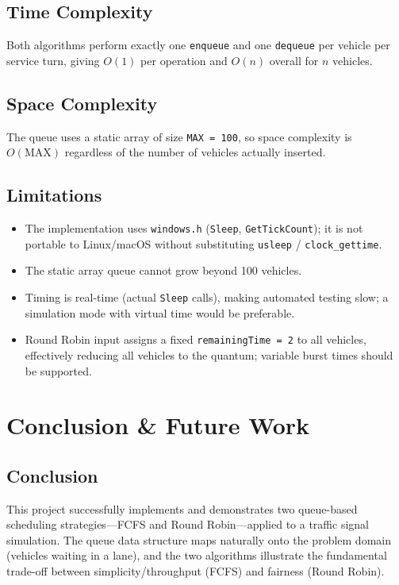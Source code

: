 \documentclass[12pt,a4paper]{article}
\begin{document}
\subsection{Time Complexity}
Both algorithms perform exactly one \texttt{enqueue} and one \texttt{dequeue} per vehicle per service turn, giving $O(1)$ per operation and $O(n)$ overall for $n$ vehicles.

\subsection{Space Complexity}
The queue uses a static array of size \texttt{MAX = 100}, so space complexity is $O(\text{MAX})$ regardless of the number of vehicles actually inserted.

\subsection{Limitations}
\begin{itemize}
    \item The implementation uses \texttt{windows.h} (\texttt{Sleep}, \texttt{GetTickCount}); it is not portable to Linux/macOS without substituting \texttt{usleep} / \texttt{clock\_gettime}.
    \item The static array queue cannot grow beyond 100 vehicles.
    \item Timing is real-time (actual \texttt{Sleep} calls), making automated testing slow; a simulation mode with virtual time would be preferable.
    \item Round Robin input assigns a fixed \texttt{remainingTime = 2} to all vehicles, effectively reducing all vehicles to the quantum; variable burst times should be supported.
\end{itemize}

\newpage

\section{Conclusion \& Future Work}

\subsection{Conclusion}
This project successfully implements and demonstrates two queue-based scheduling strategies—FCFS and Round Robin—applied to a traffic signal simulation. The queue data structure maps naturally onto the problem domain (vehicles waiting in a lane), and the two algorithms illustrate the fundamental trade-off between simplicity/throughput (FCFS) and fairness (Round Robin).
\end{document}
